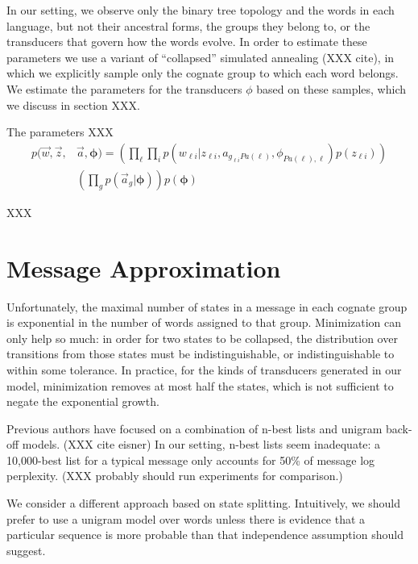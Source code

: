 \documentclass[11pt]{article}
\begin{document}
In our setting, we observe only the binary tree topology and the words in each language, but not their ancestral forms, the groups they belong to, or the transducers that
govern how the words evolve.  In order to
estimate these parameters we use a variant of ``collapsed'' simulated annealing (XXX cite), in which we explicitly sample only the cognate group to which each word belongs. 
We estimate the parameters for the transducers $\phi$ based on these samples, which we discuss in section XXX.

The parameters XXX
\begin{equation}
  \begin{split}
    p(\vec w, \vec z, &\vec a, \mathbf{\phi}) = (\prod_\ell \prod_i p(w_{\ell
    i}|z_{\ell i},a_{g_{\ell i}Pa(\ell)},\phi_{Pa(\ell),\ell})p(z_{\ell i}))\\
      & (\prod_g p(\vec a_g|\mathbf{\phi}) ) p(\mathbf{\phi})
   \end{split}
 \end{equation}

 XXX

\section{Message Approximation}

Unfortunately, the maximal number of states in a message in each
cognate group is exponential in the number of words assigned to
that group. Minimization can only help so much: in order for two
states to be collapsed, the distribution over transitions from those
states must be indistinguishable, or indistinguishable to within
some tolerance. In practice, for the kinds of transducers generated
in our model, minimization removes at most half the states, which is
not sufficient to negate the exponential growth.

Previous authors have focused on a combination of n-best lists and
unigram back-off models. (XXX cite eisner) In our setting, n-best
lists seem inadequate: a 10,000-best list for a typical message
only accounts for 50\% of message log perplexity. (XXX probably
should run experiments for comparison.)

We consider a different approach based on state splitting. Intuitively,
we should prefer to use a unigram model over words unless there is
evidence that a particular sequence is more probable than that
independence assumption should suggest.
\end{document}
